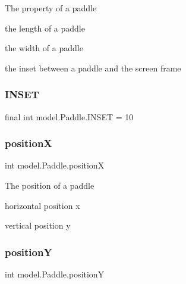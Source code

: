 The property of a paddle
\begin{DoxyItemize}
\item the length of a paddle
\item the width of a paddle
\item the inset between a paddle and the screen frame 
\end{DoxyItemize}\hypertarget{classmodel_1_1_paddle_a4bb13cdef375eba471c680ddc87407ba}{}\label{classmodel_1_1_paddle_a4bb13cdef375eba471c680ddc87407ba} 
\subsubsection{\texorpdfstring{I\+N\+S\+ET}{INSET}}
{\footnotesize\ttfamily final int model.\+Paddle.\+I\+N\+S\+ET = 10\hspace{0.3cm}{\ttfamily [private]}}

\hypertarget{classmodel_1_1_paddle_a18c9d408e60c6651a135f1d86d566a10}{}\label{classmodel_1_1_paddle_a18c9d408e60c6651a135f1d86d566a10} 
\subsubsection{\texorpdfstring{positionX}{positionX}}
{\footnotesize\ttfamily int model.\+Paddle.\+positionX\hspace{0.3cm}{\ttfamily [private]}}

The position of a paddle
\begin{DoxyItemize}
\item horizontal position x
\item vertical position y 
\end{DoxyItemize}\hypertarget{classmodel_1_1_paddle_a2eafef3f566f1c9c029c4055865cb8be}{}\label{classmodel_1_1_paddle_a2eafef3f566f1c9c029c4055865cb8be} 
\subsubsection{\texorpdfstring{positionY}{positionY}}
{\footnotesize\ttfamily int model.\+Paddle.\+positionY\hspace{0.3cm}{\ttfamily [private]}}

